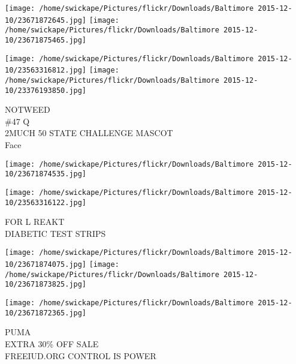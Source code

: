 \documentclass[10pt,letterpaper]{article}
\begin{document}
\texttt{[image: /home/swickape/Pictures/flickr/Downloads/Baltimore 2015-12-10/23671872645.jpg]}
\texttt{[image: /home/swickape/Pictures/flickr/Downloads/Baltimore 2015-12-10/23671875465.jpg]}

\texttt{[image: /home/swickape/Pictures/flickr/Downloads/Baltimore 2015-12-10/23563316812.jpg]}
\texttt{[image: /home/swickape/Pictures/flickr/Downloads/Baltimore 2015-12-10/23376193850.jpg]}

NOTWEED\\
\#47 Q\\
2MUCH 50 STATE CHALLENGE MASCOT\\
Face\\
\pagebreak

\texttt{[image: /home/swickape/Pictures/flickr/Downloads/Baltimore 2015-12-10/23671874535.jpg]}

\vspace{0.25in}
\texttt{[image: /home/swickape/Pictures/flickr/Downloads/Baltimore 2015-12-10/23563316122.jpg]}

FOR L REAKT\\
DIABETIC TEST STRIPS\\
\pagebreak

\texttt{[image: /home/swickape/Pictures/flickr/Downloads/Baltimore 2015-12-10/23671874075.jpg]}
\texttt{[image: /home/swickape/Pictures/flickr/Downloads/Baltimore 2015-12-10/23671873825.jpg]}

\texttt{[image: /home/swickape/Pictures/flickr/Downloads/Baltimore 2015-12-10/23671872365.jpg]}

PUMA\\
EXTRA 30\% OFF SALE\\
FREEIUD.ORG CONTROL IS POWER\\
\pagebreak
\end{document}
